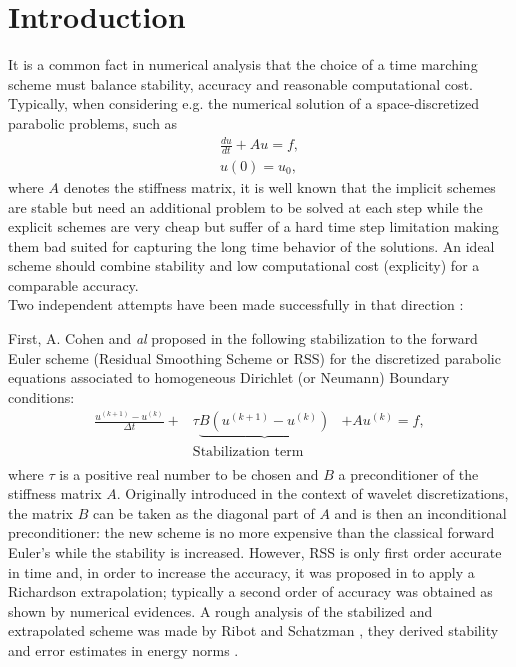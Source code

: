 \documentclass[11pt]{article}
\newcommand{\Frac}[2] {\frac{\textstyle #1} {\textstyle #2}}
\begin{document}
{\section{Introduction}
It is a common fact in numerical analysis that the choice of a time
marching scheme must balance stability, accuracy and reasonable computational
cost. Typically, when considering e.g. the numerical solution of a space-discretized
parabolic problems, such as
\begin{equation}
\begin{array}{l}
\Frac{du}{dt} +Au=f,\\
u(0)=u_0,
\end{array}
\end{equation}
where $A$ denotes the stiffness matrix, it is well known that  the implicit schemes are stable but need an
additional problem to be solved at each step while the explicit
schemes are very cheap but suffer of a hard time step limitation
making them bad suited for capturing the long time behavior of the
solutions. An ideal scheme should combine stability and low
computational cost (explicity) for a comparable accuracy.\\

Two independent attempts have been made successfully in that
direction :


First, A. Cohen and {\it al}  proposed in 
\cite{AverbuchCohenIsraeli} the following stabilization to the
forward Euler scheme (Residual Smoothing Scheme or RSS) for the discretized parabolic equations associated to homogeneous Dirichlet (or Neumann) Boundary conditions:
\begin{equation}
\begin{array}{lcl}
\Frac{u^{(k+1)}-u^{(k)}}{\Delta t}+&\tau
\underbrace{B(u^{(k+1)}-u^{(k)})}&+Au^{(k)}=f,\\
 & \mbox{Stabilization term}& \\
 \end{array}
\end{equation}
where $\tau$ is a positive real number to be chosen and $B$ a preconditioner of the stiffness matrix $A$.
Originally introduced in the context of wavelet discretizations, the
matrix $B$ can be taken as the diagonal part of $A$ and is then an inconditional preconditioner: the new scheme
is no more expensive than the classical forward Euler's while the
stability is increased. However, RSS is only first order accurate in
time and, in order to increase the accuracy, it was proposed in
\cite{AverbuchCohenIsraeli} to apply a Richardson extrapolation; typically a second order of accuracy was
obtained as shown by numerical evidences. A rough analysis of the
stabilized and extrapolated scheme was made by Ribot and Schatzman
\cite{MRibotMSchatzman,RibotSchatzman2}, they derived stability and error estimates in energy norms .

}
\end{document}
